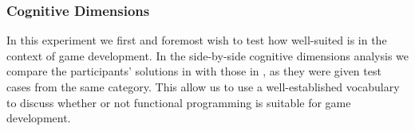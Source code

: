 \subsubsection{Cognitive Dimensions}
In this experiment we first and foremost wish to test how well-suited \fsh is in the context of game development. In the side-by-side cognitive dimensions analysis we compare the participants' solutions in \fsh with those in \csh, as they were given test cases from the same category. This allow us to use a well-established vocabulary to discuss whether or not functional programming is suitable for game development.















